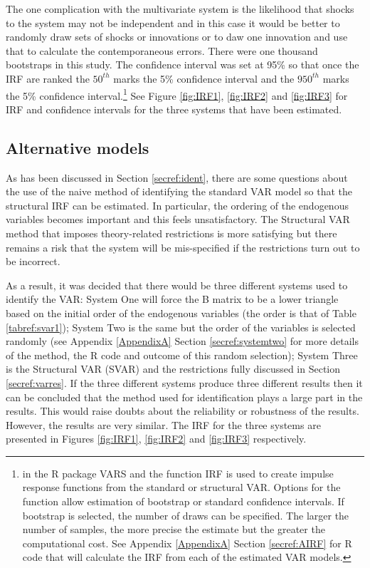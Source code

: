 \documentclass[12pt, a4paper, oneside]{article}\usepackage[]{graphicx}\usepackage[]{color}
\begin{document}
The one complication with the multivariate system is the likelihood that shocks to the system may not be independent and in this case it would be better to randomly draw sets of shocks or innovations or to daw one innovation and use that to calculate the contemporaneous errors.  There were one thousand bootstraps in this study.  The confidence interval was set at 95\% so that once the IRF are ranked the $50^{th}$ marks the 5\% confidence interval and the $950^{th}$ marks the 5\% confidence interval.\footnote{in the R package VARS \citep{varsa} and \citep{varsb} the function IRF is used to create impulse response functions from the standard or structural VAR.  Options for the function allow estimation of bootstrap or standard confidence intervals. If bootstrap is selected, the number of draws can be specified.  The larger the number of samples, the more precise the estimate but the greater the computational cost.  See Appendix \ref{AppendixA} Section \ref{secref:AIRF} for R code that will calculate the IRF from each of the estimated VAR models.}  See Figure \ref{fig:IRF1}, \ref{fig:IRF2} and \ref{fig:IRF3} for IRF and confidence intervals for the three systems that have been estimated.  

\subsection{Alternative models}\label{secref:IRF2}
As has  been discussed in Section \ref{secref:ident}, there are some questions about the use of the naive method of  identifying the standard VAR model so that the structural IRF can be estimated.  In particular, the ordering of the endogenous variables becomes important and this feels unsatisfactory.  The Structural VAR method that imposes theory-related restrictions is more satisfying but there remains a risk that the system will be mis-specified if the restrictions turn out to be incorrect.  

As a result, it was decided that there would be three different systems used to identify the VAR:  System One will force the B matrix to be a lower triangle based on the initial order of the endogenous variables (the order is that of Table \ref{tabref:svar1}); System Two is the same but the order of the variables is selected randomly (see Appendix \ref{AppendixA} Section \ref{secref:systemtwo} for more details of the method, the R code and outcome of this random selection); System Three is the Structural VAR (SVAR) and the restrictions fully discussed in Section \ref{secref:varres}.  If the three different systems produce three different results then it can be concluded that the method used for identification plays a large part in the results.  This would raise doubts about the reliability or robustness of the results. However, the results are very similar.  The IRF for the three systems are presented in Figures \ref{fig:IRF1}, \ref{fig:IRF2} and \ref{fig:IRF3} respectively.  
\end{document}
